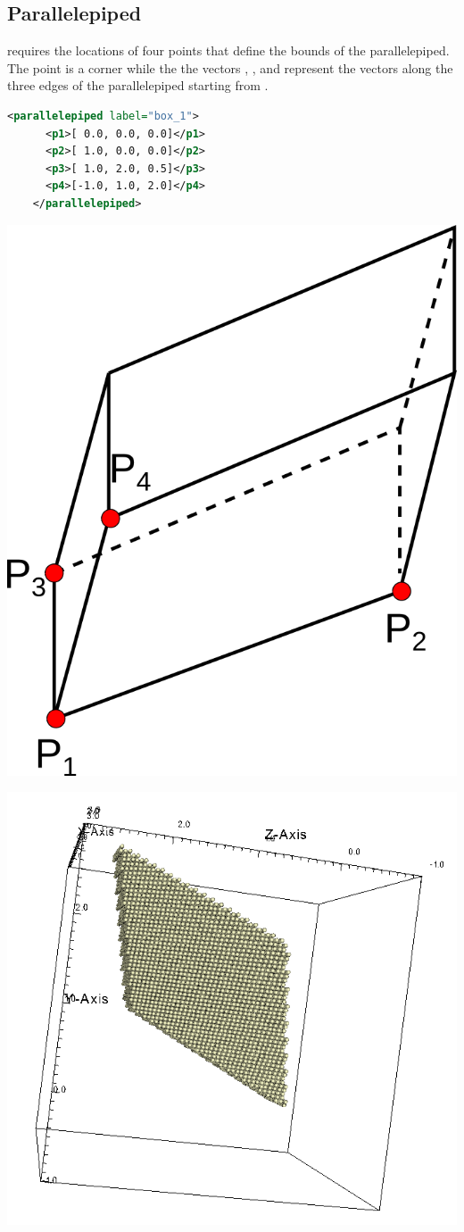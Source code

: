 \subsection{Parallelepiped}
\begin{minipage}{0.6\textwidth}
   requires the locations of four points
  that define the bounds of the parallelepiped.  The point 
  is a corner while the the vectors , ,
  and  represent the vectors along the three edges
  of the parallelepiped starting from .
  \begin{lstlisting}[language=XML]
    <parallelepiped label="box_1">
      <p1>[ 0.0, 0.0, 0.0]</p1>
      <p2>[ 1.0, 0.0, 0.0]</p2>
      <p3>[ 1.0, 2.0, 0.5]</p3>
      <p4>[-1.0, 1.0, 2.0]</p4>
    </parallelepiped>
  \end{lstlisting}
  \centering
  \includegraphics[width=0.3\columnwidth]{FIGS/geometry/naa_box_def.png}
\end{minipage}
\begin{minipage}{0.4\textwidth}
  \centering
  \includegraphics[width=0.9\columnwidth]{FIGS/geometry/geom_naa_box.png}
\end{minipage}

